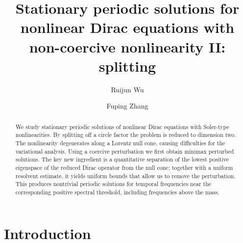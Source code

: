 \documentclass[11pt,final]{amsart}
\title[Splitting Periodic Dirac waves]{Stationary periodic solutions for nonlinear Dirac equations with non-coercive nonlinearity II: splitting}
\author[R. Wu]{Ruijun Wu}
\author[F. Zhang]{Fuping Zhang}
\begin{document}
\begin{abstract}
    We study stationary periodic solutions of nonlinear Dirac equations with Soler-type nonlinearities. 
    By splitting off a circle factor the problem is reduced to dimension two.
    The nonlinearity degenerates along a Lorentz null cone, causing difficulties for the variational analysis. 
    Using a coercive perturbation we first obtain minimax perturbed solutions. 
    The key new ingredient is a quantitative separation of the lowest positive eigenspace of the reduced Dirac operator from the null cone; together with a uniform resolvent estimate, it yields uniform bounds that allow us to remove the perturbation.
    This produces nontrivial periodic solutions for temporal frequencies near the corresponding positive spectral threshold, including frequencies above the mass.

\end{abstract}

\maketitle

\section{Introduction}
\end{document}
